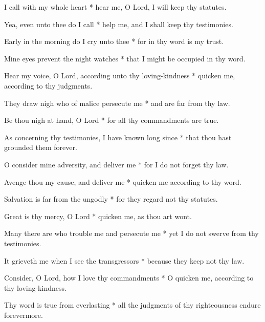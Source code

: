 I call with my whole heart * hear me, O Lord, I will keep thy statutes.

Yea, even unto thee do I call * help me, and I shall keep thy testimonies.

Early in the morning do I cry unto thee * for in thy word is my trust.

Mine eyes prevent the night watches * that I might be occupied in thy word.

Hear my voice, O Lord, according unto thy loving-kindness * quicken me, according to thy judgments.

They draw nigh who of malice persecute me * and are far from thy law.

Be thou nigh at hand, O Lord * for all thy commandments are true.

As concerning thy testimonies, I have known long since * that thou hast grounded them forever.

O consider mine adversity, and deliver me * for I do not forget thy law.

Avenge thou my cause, and deliver me * quicken me according to thy word.

Salvation is far from the ungodly * for they regard not thy statutes.

Great is thy mercy, O Lord * quicken me, as thou art wont.

Many there are who trouble me and persecute me * yet I do not swerve from thy testimonies.

It grieveth me when I see the transgressors * because they keep not thy law.

Consider, O Lord, how I love thy commandments * O quicken me, according to thy loving-kindness.

Thy word is true from everlasting * all the judgments of thy righteousness endure forevermore.